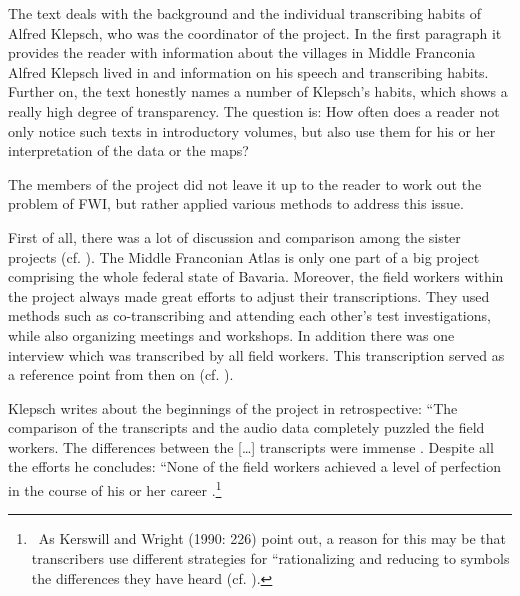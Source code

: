 \documentclass[output=paper]{LSP/langsci}
\begin{document}
The text deals with the background and the individual transcribing habits of Alfred Klepsch, who was the coordinator of the project. In the first paragraph it provides the reader with information about the villages in Middle Franconia Alfred Klepsch lived in and information on his speech and transcribing habits. Further on, the text honestly names a number of Klepsch's habits, which shows a really high degree of transparency. The question is: How often does a reader not only notice such texts in introductory volumes, but also use them for his or her interpretation of the data or the maps?

The members of the project did not leave it up to the reader to work out the problem of FWI, but rather applied various methods to address this issue.

First of all, there was a lot of discussion and comparison among the sister projects (cf. \citealt[25 ff.]{klepsch_wie_2013}). The Middle Franconian Atlas is only one part of a big project comprising the whole federal state of Bavaria. Moreover, the field workers within the project always made great efforts to adjust their transcriptions. They used methods such as co-transcribing and attending each other's test investigations, while also organizing meetings and workshops. In addition there was one interview which was transcribed by all field workers. This transcription served as a reference point from then on (cf. \citealt[26]{klepsch_wie_2013}).

Klepsch writes about the beginnings of the project in retrospective: ``The comparison of the transcripts and the audio data completely puzzled the field workers. The differences between the […] transcripts were immense{\textquotedbl} \citep[25]{klepsch_wie_2013}. Despite all the efforts he concludes: ``None of the field workers achieved a level of perfection in the course of his or her career{\textquotedbl} \citep[27]{klepsch_wie_2013}.\footnote{\ As Kerswill and Wright (1990: 226) point out, a reason for this may be that transcribers use different strategies for ``rationalizing and reducing to symbols the differences they have heard{\textquotedbl} (cf. \citealt[269]{kerswill_limits_1990}).}
\end{document}
